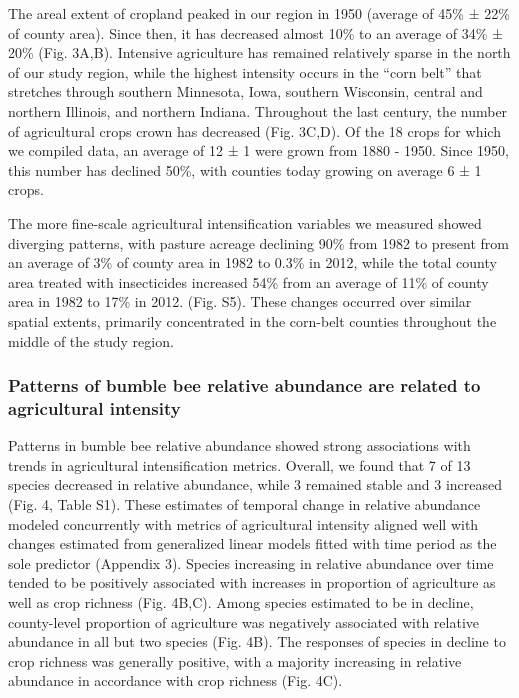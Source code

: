 \documentclass[11pt,]{article}
\begin{document}
The areal extent of cropland peaked in our region in 1950 (average of
45\% ± 22\% of county area). Since then, it has decreased almost 10\% to
an average of 34\% ± 20\% (Fig. 3A,B). Intensive agriculture has
remained relatively sparse in the north of our study region, while the
highest intensity occurs in the ``corn belt'' that stretches through
southern Minnesota, Iowa, southern Wisconsin, central and northern
Illinois, and northern Indiana. Throughout the last century, the number
of agricultural crops crown has decreased (Fig. 3C,D). Of the 18 crops
for which we compiled data, an average of 12 ± 1 were grown from 1880 -
1950. Since 1950, this number has declined 50\%, with counties today
growing on average 6 ± 1 crops.

The more fine-scale agricultural intensification variables we measured
showed diverging patterns, with pasture acreage declining 90\% from 1982
to present from an average of 3\% of county area in 1982 to 0.3\% in
2012, while the total county area treated with insecticides increased
54\% from an average of 11\% of county area in 1982 to 17\% in 2012.
(Fig. S5). These changes occurred over similar spatial extents,
primarily concentrated in the corn-belt counties throughout the middle
of the study region.

\hypertarget{patterns-of-bumble-bee-relative-abundance-are-related-to-agricultural-intensity}{%
\subsubsection{Patterns of bumble bee relative abundance are related to
agricultural
intensity}\label{patterns-of-bumble-bee-relative-abundance-are-related-to-agricultural-intensity}}

Patterns in bumble bee relative abundance showed strong associations
with trends in agricultural intensification metrics. Overall, we found
that 7 of 13 species decreased in relative abundance, while 3 remained
stable and 3 increased (Fig. 4, Table S1). These estimates of temporal
change in relative abundance modeled concurrently with metrics of
agricultural intensity aligned well with changes estimated from
generalized linear models fitted with time period as the sole predictor
(Appendix 3). Species increasing in relative abundance over time tended
to be positively associated with increases in proportion of agriculture
as well as crop richness (Fig. 4B,C). Among species estimated to be in
decline, county-level proportion of agriculture was negatively
associated with relative abundance in all but two species (Fig. 4B). The
responses of species in decline to crop richness was generally positive,
with a majority increasing in relative abundance in accordance with crop
richness (Fig. 4C).
\end{document}
